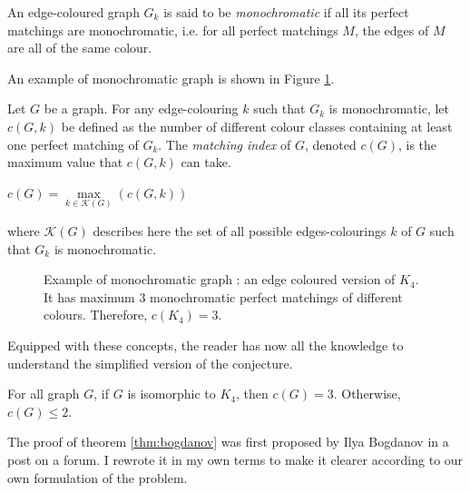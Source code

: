 \begin{definition}
    \label{def:monochromatic_graph}
    An edge-coloured graph $G_k$ is said to be \textit{monochromatic} if all its perfect matchings are monochromatic, i.e. for all perfect matchings $M$, the edges of $M$ are all of the same colour.
\end{definition}

An example of monochromatic graph is shown in Figure \ref{fig:k4_pm}.

\begin{definition}
    \label{def:matching_index}
    Let $G$ be a graph. For any edge-colouring $k$ such that $G_k$ is monochromatic, let $c(G, k)$ be defined as the number of different colour classes containing at least one perfect matching of $G_k$. The \textit{matching index} of $G$, denoted $c(G)$, is the maximum value that $c(G, k)$ can take.
    \begin{center}
        $c(G) = \max\limits_{k \in \mathcal{K}(G)}(c(G, k))$
    \end{center}
    where $\mathcal{K}(G)$ describes here the set of all possible edges-colourings $k$ of $G$ such that $G_{k}$ is monochromatic.
\end{definition}

\begin{figure}[H]
    \caption{Example of monochromatic graph : an edge coloured version of $K_4$. It has maximum 3 monochromatic perfect matchings of different colours. Therefore, $c(K_4) = 3$.}
    \label{fig:k4_pm}
\end{figure}

Equipped with these concepts, the reader has now all the knowledge to understand the simplified version of the conjecture.

\begin{theorem}
    \label{thm:bogdanov}
    For all graph $G$, if $G$ is isomorphic to $K_4$, then $c(G) = 3$. Otherwise, $c(G) \leq 2$.
\end{theorem}

The proof of theorem \ref{thm:bogdanov} was first proposed by Ilya Bogdanov in a post on a forum. \cite{bogdanov} I rewrote it in my own terms to make it clearer according to our own formulation of the problem.

